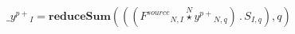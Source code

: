 \documentclass[border=2pt]{standalone}
\begin{document}
${{\_y^{p+}}}{_{I}}=\textbf{reduceSum}\left(\left(\left({{F^{source}}}{_{N, I}} \stackrel{N}{\star} {{y^{p +}}}{_{N, q}}\right) \, . \, {{S}}{_{I, q}}\right),q\right)$
\end{document}
